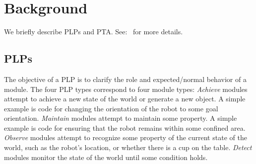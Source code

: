 \documentclass[letterpaper]{article}
\begin{document}
\section{Background}
We briefly describe PLPs and PTA.
See:~\citet{PLP-IROS16,PTA} for more details.


\subsection{PLPs}
The objective of a PLP is to clarify the role and expected/normal behavior of a module.
%
The four PLP types correspond to four module types: {\em Achieve} modules attempt to achieve a new state of the world
or generate a new object. A simple example is code for changing the orientation of the robot to some goal orientation. {\em Maintain} modules attempt to maintain some property. A simple example is code for  ensuring that the robot remains within some confined area.
{\em Observe}  modules  attempt to recognize some property of the current state of the world, such as the robot's location, or whether there is a cup on the table.
 {\em Detect\/} modules monitor the state of the world until some condition holds.
\end{document}
